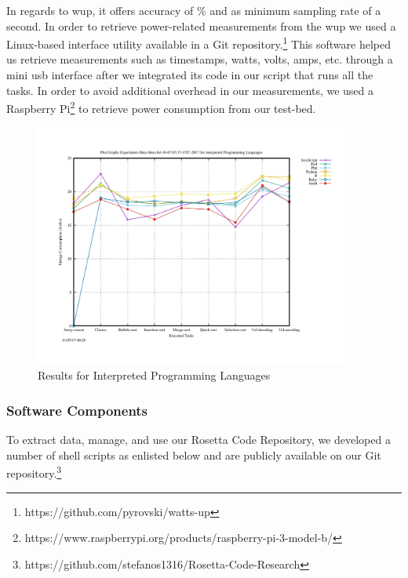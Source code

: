 In regards to {\sc wup}, it offers accuracy of \% and 
as minimum sampling rate of a second. 
In order to retrieve power-related measurements from the {\sc wup} 
we used a Linux-based interface utility available in a Git 
repository.\footnote{https://github.com/pyrovski/watts-up}
This software helped us retrieve measurements such as timestamps, 
watts, volts, amps, etc. through a mini {\sc usb} interface after 
we integrated its code in our script that runs all the tasks. 
In order to avoid additional overhead in our measurements, we 
used a Raspberry Pi\footnote{https://www.raspberrypi.org/products/raspberry-pi-3-model-b/} 
to retrieve power consumption from our test-bed.  


\begin{figure}
	\centering
	\includegraphics[width=\textwidth,height=8cm]{"Graph_Experiment-Data-Mon-Jul-10-07:03:37-UTC-2017_interpreted-1"}
	\caption{Results for Interpreted Programming Languages}
	\label{Interpreted}
\end{figure}

\subsubsection{Software Components} \label{software_components}
To extract data, manage, and use our Rosetta Code Repository, 
we developed a number of shell scripts as enlisted below and are 
publicly available on our Git repository.\footnote{https://github.com/stefanos1316/Rosetta-Code-Research} 

